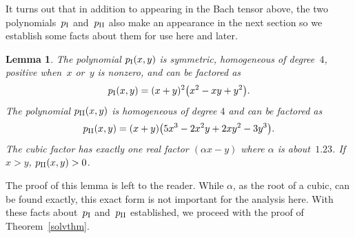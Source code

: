 \documentclass[pdftex]{sigma}
\numberwithin{equation}{section}
\newtheorem{Lemma}[Theorem]{Lemma}
\begin{document}
It turns out that in addition to appearing in the Bach tensor above, the two polynomials~$p_{\rm I}$ and~$p_{\rm II}$ also make an appearance in the next section so we establish some facts about them for use here and later.

\begin{Lemma}The polynomial $p_{\rm I}(x,y)$ is symmetric, homogeneous of degree~$4$, positive when~$x$ or~$y$ is nonzero, and can be factored as
\[
p_{\rm I}(x, y) = (x+y)^2\big(x^2 - xy + y^2\big).
\]
The polynomial $p_{\rm II}(x,y)$ is homogeneous of degree $4$ and can be factored as
\[
p_{\rm II}(x, y) = (x+y)\big(5x^3 - 2x^2y + 2xy^2 - 3y^3\big).
\]
The cubic factor has exactly one real factor $(\alpha x - y)$ where $\alpha$ is about~$1.23$. If $x > y$, $p_{\rm II}(x, y) > 0$.
\end{Lemma}

The proof of this lemma is left to the reader. While $\alpha$, as the root of a cubic, can be found exactly, this exact form is not important for the analysis here. With these facts about~$p_{\rm I}$ and~$p_{\rm II}$ established, we proceed with the proof of Theorem~\ref{solvthm}.
\end{document}
